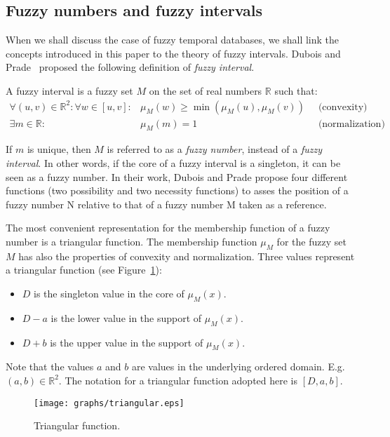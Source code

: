 \subsection{\label{subsubsec:fuzzy}Fuzzy numbers and fuzzy intervals}
When we shall discuss the case of fuzzy temporal databases, we shall link the concepts introduced in this paper to the theory of fuzzy intervals. Dubois and Prade~\cite{Dubois1983} proposed the following definition of \emph{fuzzy interval}.
\begin{definition}
A fuzzy interval is a fuzzy set $M$ on the set of real numbers $\mathbb{R}$ such that:
\begin{eqnarray}
\forall (u,v)\in\mathbb{R}^2:\forall w \in [u,v]:&\mu_M(w) \geq\min(\mu_M(u),\mu_M(v)) \ &\mbox{ (convexity) } \\
\exists m \in \mathbb{R}:& \mu_M(m)=1 \ &\mbox{ (normalization) }
\end{eqnarray}
\end{definition}
If $m$ is unique, then $M$ is referred to as a \emph{fuzzy number}, instead of a \emph{fuzzy interval}. In other words, if the core of a fuzzy interval is a singleton, it can be seen as a fuzzy number. In their work, Dubois and Prade propose four different functions (two possibility and two necessity functions) to asses the position of a fuzzy number N relative to that of a fuzzy number M taken as a reference.

The most convenient representation for the membership function of a fuzzy number is a triangular function. The membership function $\mu_M$ for the fuzzy set $M$ has also the properties of convexity and normalization. Three values represent a triangular function (see Figure~\ref{fig:triangular}):
\begin{itemize}
\item
$D$ is the singleton value in the core of $\mu_M(x)$.
\item
$D-a$ is the lower value in the support of $\mu_M(x)$. 
\item
$D+b$ is the upper value in the support of $\mu_M(x)$.
\end{itemize}
Note that the values $a$ and $b$ are values in the underlying ordered domain. E.g. $(a,b) \in \mathbb{R}^2$. The notation for a triangular function adopted here is $[D,a,b]$.
\begin{figure}[h!]
  \centering
  \texttt{[image: graphs/triangular.eps]}
  \caption{Triangular function.}
  \label{fig:triangular}
\end{figure}


